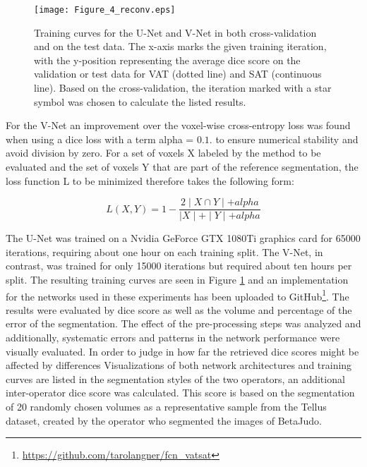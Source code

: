 \documentclass[10pt,letterpaper]{article}
\begin{document}
		\begin{figure}[H] %


			\texttt{[image: Figure\_4\_reconv.eps]}

			\caption{Training curves for the U-Net and V-Net in both cross-validation and on the test data. The x-axis marks the given training iteration, with the y-position representing the average dice score on the validation or test data for VAT (dotted line) and SAT (continuous line). Based on the cross-validation, the iteration marked with a star symbol was chosen to calculate the listed results.}

			\label{fig4} %

		\end{figure}


		For the V-Net an improvement over the voxel-wise cross-entropy loss was found when using a dice loss with a term alpha = $0.1$. to ensure numerical stability and avoid division by zero. For a set of voxels X labeled by the method to be evaluated and the set of voxels Y that are part of the reference segmentation, the loss function L to be minimized therefore takes the following form:


		\begin{equation}L(X,Y)=1 - \frac{2 \mid X \cap Y \mid + alpha}{\mid X\mid +\mid Y \mid + alpha}
		\end{equation}
		\label{eq1}

	The U-Net was trained on a Nvidia GeForce GTX 1080Ti graphics card for 65000 iterations, requiring about one hour on each training split. The V-Net, in contrast, was trained for only 15000 iterations but required about ten hours per split. The resulting training curves are seen in Figure \ref{fig4} and an implementation for the networks used in these experiments has been uploaded to GitHub\footnote{\url{https://github.com/tarolangner/fcn_vatsat}}. The results were evaluated by dice score as well as the volume and percentage of the error of the segmentation. The effect of the pre-processing steps was analyzed and additionally, systematic errors and patterns in the network performance were visually evaluated. In order to judge in how far the retrieved dice scores might be affected by differences Visualizations of both network architectures and training curves are listed in the segmentation styles of the two operators, an additional inter-operator dice score was calculated. This score is based on the segmentation of 20 randomly chosen volumes as a representative sample from the Tellus dataset, created by the operator who segmented the images of BetaJudo.
\end{document}
